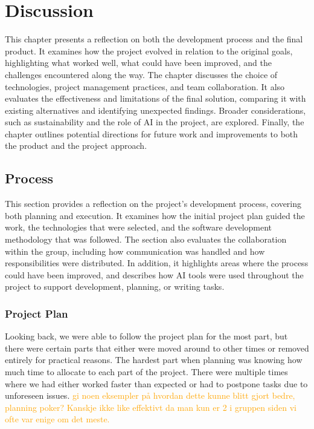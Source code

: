 \chapter{Discussion}\label{chap:discussion}

This chapter presents a reflection on both the development process and the final product. It examines how the project evolved in relation to the original goals, highlighting what worked well, what could have been improved, and the challenges encountered along the way. The chapter discusses the choice of technologies, project management practices, and team collaboration. It also evaluates the effectiveness and limitations of the final solution, comparing it with existing alternatives and identifying unexpected findings. Broader considerations, such as sustainability and the role of AI in the project, are explored. Finally, the chapter outlines potential directions for future work and improvements to both the product and the project approach.

\section{Process}

This section provides a reflection on the project's development process, covering both planning and execution. It examines how the initial project plan guided the work, the technologies that were selected, and the software development methodology that was followed. The section also evaluates the collaboration within the group, including how communication was handled and how responsibilities were distributed. In addition, it highlights areas where the process could have been improved, and describes how AI tools were used throughout the project to support development, planning, or writing tasks.

\subsection{Project Plan}

Looking back, we were able to follow the project plan for the most part, but there were certain parts that either were moved around to other times or removed entirely for practical reasons. The hardest part when planning was knowing how much time to allocate to each part of the project. There were multiple times where we had either worked faster than expected or had to postpone tasks due to unforeseen issues. \textcolor{orange}{gi noen eksempler på hvordan dette kunne blitt gjort bedre, planning poker? Kanskje ikke like effektivt da man kun er 2 i gruppen siden vi ofte var enige om det meste.}

